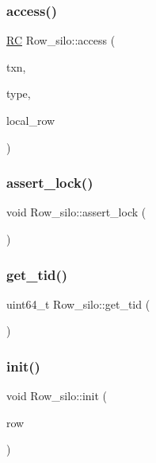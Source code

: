 \subsubsection{\texorpdfstring{access()}{access()}}
{\footnotesize\ttfamily \hyperlink{global_8h_a78c49a674c810fdd03d20432f7be864a}{RC} Row\+\_\+silo\+::access (\begin{DoxyParamCaption}\item[{\hyperlink{classtxn__man}{txn\+\_\+man} $\ast$}]{txn,  }\item[{\hyperlink{global_8h_a1a7f6ca1462293fe053b5ae74a6c4eda}{Ts\+Type}}]{type,  }\item[{\hyperlink{classrow__t}{row\+\_\+t} $\ast$}]{local\+\_\+row }\end{DoxyParamCaption})}

\mbox{\label{classRow__silo_a4b2063bbe50907e42154ca68d86d0ab6}} 
\subsubsection{\texorpdfstring{assert\+\_\+lock()}{assert\_lock()}}
{\footnotesize\ttfamily void Row\+\_\+silo\+::assert\+\_\+lock (\begin{DoxyParamCaption}{ }\end{DoxyParamCaption})\hspace{0.3cm}{\ttfamily [inline]}}

\mbox{\label{classRow__silo_a4d1732ce786a2f439c6639820bf5742a}} 
\subsubsection{\texorpdfstring{get\+\_\+tid()}{get\_tid()}}
{\footnotesize\ttfamily uint64\+\_\+t Row\+\_\+silo\+::get\+\_\+tid (\begin{DoxyParamCaption}{ }\end{DoxyParamCaption})}

\mbox{\label{classRow__silo_aefc33cebd42cdf7901544d7e7130c704}} 
\subsubsection{\texorpdfstring{init()}{init()}}
{\footnotesize\ttfamily void Row\+\_\+silo\+::init (\begin{DoxyParamCaption}\item[{\hyperlink{classrow__t}{row\+\_\+t} $\ast$}]{row }\end{DoxyParamCaption})}

